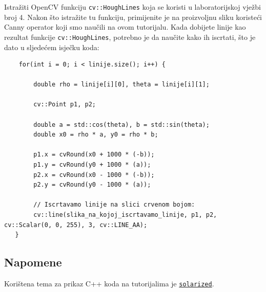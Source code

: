 \documentclass[a4paper, 12pt]{article}
\begin{document}
Istražiti OpenCV funkciju \lstinline{cv::HoughLines} koja se koristi u laboratorijskoj vježbi broj 4. Nakon što istražite tu funkciju, primijenite je na proizvoljnu sliku koristeći Canny operator koji smo naučili na ovom tutorijalu. Kada dobijete linije kao rezultat funkcije \lstinline{cv::HoughLines}, potrebno je da naučite kako ih iscrtati, što je dato u sljedećem isječku koda:

\begin{lstlisting}
    for(int i = 0; i < linije.size(); i++) {

        double rho = linije[i][0], theta = linije[i][1];

        cv::Point p1, p2;

        double a = std::cos(theta), b = std::sin(theta);
        double x0 = rho * a, y0 = rho * b;

        p1.x = cvRound(x0 + 1000 * (-b));
        p1.y = cvRound(y0 + 1000 * (a));
        p2.x = cvRound(x0 - 1000 * (-b));
        p2.y = cvRound(y0 - 1000 * (a));

        // Iscrtavamo linije na slici crvenom bojom:
        cv::line(slika_na_kojoj_iscrtavamo_linije, p1, p2, cv::Scalar(0, 0, 255), 3, cv::LINE_AA);
   }
\end{lstlisting}

\subsection*{Napomene}

Korištena tema za prikaz C++ koda na tutorijalima je \href{https://ethanschoonover.com/solarized/}{\lstinline{solarized}}\cite{solarized}.

\printbibliography
\end{document}
